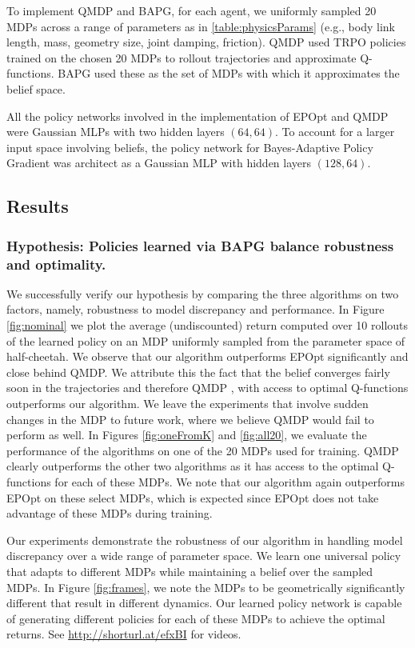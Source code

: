 \documentclass{article}
\begin{document}
To implement QMDP and BAPG, for each agent, we uniformly sampled 20 MDPs across a range of parameters as in \ref{table:physicsParams} (e.g., body link length, mass, geometry size, joint damping, friction). QMDP used TRPO policies trained on the chosen 20 MDPs to rollout trajectories and approximate Q-functions. BAPG used these as the set of MDPs with which it approximates the belief space.

All the policy networks involved in the implementation of EPOpt and QMDP were Gaussian MLPs with two hidden layers $(64, 64)$. To account for a larger input space involving beliefs, the policy network for Bayes-Adaptive Policy Gradient was architect as a Gaussian MLP with hidden layers $(128, 64)$.

\subsection{Results}
\subsubsection*{Hypothesis: Policies learned via BAPG balance robustness and optimality.}

We successfully verify our hypothesis by comparing the three algorithms on two factors, namely, robustness to model discrepancy and performance. In Figure \ref{fig:nominal} we plot the average (undiscounted) return computed over 10 rollouts of the learned policy on an MDP uniformly sampled from the parameter space of half-cheetah. We observe that our algorithm outperforms EPOpt significantly and close behind QMDP. We attribute this the fact that the belief converges fairly soon in the trajectories and therefore QMDP , with access to optimal Q-functions outperforms our algorithm. We leave the experiments that involve sudden changes in the MDP to future work, where we believe QMDP would fail to perform as well. In Figures \ref{fig:oneFromK} and \ref{fig:all20}, we evaluate the performance of the algorithms on one of the 20 MDPs used for training. QMDP clearly outperforms the other two algorithms as it has access to the optimal Q-functions for each of these MDPs. We note that our algorithm again outperforms EPOpt on these select MDPs, which is expected since EPOpt does not take advantage of these MDPs during training.

Our experiments demonstrate the robustness of our algorithm in handling model discrepancy over a wide range of parameter space. We learn one universal policy that adapts to different MDPs while maintaining a belief over the sampled MDPs. In Figure \ref{fig:frames}, we note the MDPs to be geometrically significantly different that result in different dynamics. Our learned policy network is capable of generating different policies for each of these MDPs to achieve the optimal returns. See \url{http://shorturl.at/efxBI} for videos.
\end{document}
